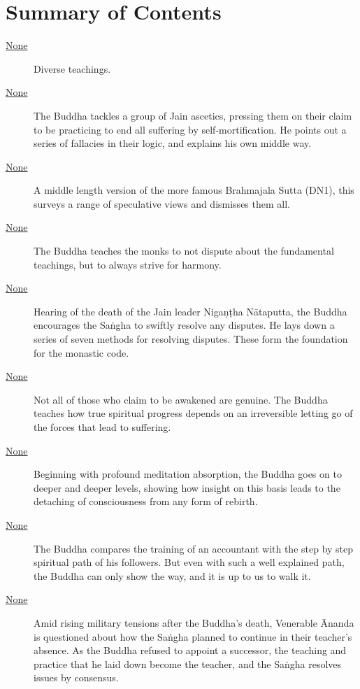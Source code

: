 \documentclass[12pt,openany]{book}%
\begin{document}
\newpage

\setlength{\parindent}{1.5em}%
\tableofcontents
\newpage
\pagestyle{fancy}
%
\chapter*{Summary of Contents}

\begin{description}%
\item[\href{\#mn{-}devadahavagga}{None}] Diverse teachings.%
\item[\href{\#mn101}{None}] The Buddha tackles a group of Jain ascetics, pressing them on their claim to be practicing to end all suffering by self-mortification. He points out a series of fallacies in their logic, and explains his own middle way.%
\item[\href{\#mn102}{None}] A middle length version of the more famous Brahmajala Sutta (DN1), this surveys a range of speculative views and dismisses them all.%
\item[\href{\#mn103}{None}] The Buddha teaches the monks to not dispute about the fundamental teachings, but to always strive for harmony.%
\item[\href{\#mn104}{None}] Hearing of the death of the Jain leader \textsanskrit{Nigaṇṭha} \textsanskrit{Nātaputta}, the Buddha encourages the \textsanskrit{Saṅgha} to swiftly resolve any disputes. He lays down a series of seven methods for resolving disputes. These form the foundation for the monastic code.%
\item[\href{\#mn105}{None}] Not all of those who claim to be awakened are genuine. The Buddha teaches how true spiritual progress depends on an irreversible letting go of the forces that lead to suffering.%
\item[\href{\#mn106}{None}] Beginning with profound meditation absorption, the Buddha goes on to deeper and deeper levels, showing how insight on this basis leads to the detaching of consciousness from any form of rebirth.%
\item[\href{\#mn107}{None}] The Buddha compares the training of an accountant with the step by step spiritual path of his followers. But even with such a well explained path, the Buddha can only show the way, and it is up to us to walk it.%
\item[\href{\#mn108}{None}] Amid rising military tensions after the Buddha’s death, Venerable Ānanda is questioned about how the \textsanskrit{Saṅgha} planned to continue in their teacher’s absence. As the Buddha refused to appoint a successor, the teaching and practice that he laid down become the teacher, and the \textsanskrit{Saṅgha} resolves issues by consensus.%

\end{description}
\end{document}
